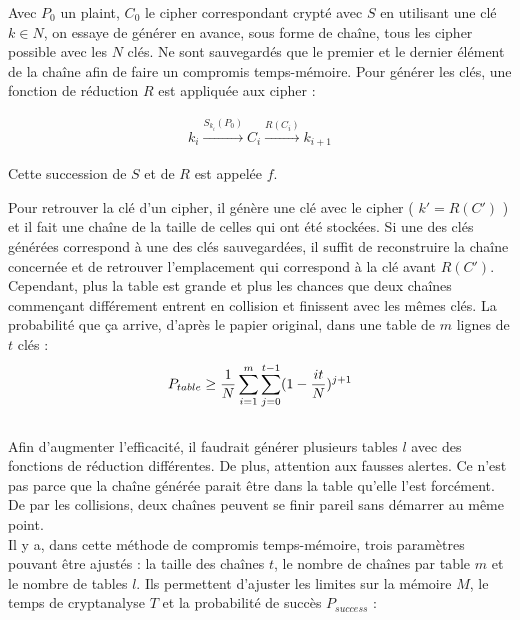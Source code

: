
	Avec $P_0$ un \gls{plaint}, $C_0$ le \gls{cipher} correspondant crypté avec $S$ en utilisant une clé $k \in N$, on essaye de générer en avance, sous forme de chaîne, tous les \gls{cipher} possible avec les $N$ clés. Ne sont sauvegardés que le premier et le dernier élément de la chaîne afin de faire un compromis temps-mémoire. Pour générer les clés, une fonction de réduction $R$ est appliquée aux \gls{cipher} :

	\begin{align*}
		k_i \overset{S_{k_i}(P_0)}{\longrightarrow} C_i \overset{R(C_i)}{\longrightarrow} k_{i+1}
	\end{align*}

	Cette succession de $S$ et de $R$ est appelée $f$.

	Pour retrouver la clé d'un \gls{cipher}, il génère une clé avec le \gls{cipher} ( $k' = R(C')$ ) et il fait une chaîne de la taille de celles qui ont été stockées. Si une des clés générées correspond à une des clés sauvegardées, il suffit de reconstruire la chaîne concernée et de retrouver l'emplacement qui correspond à la clé avant $R(C')$.\\

	Cependant, plus la table est grande et plus les chances que deux chaînes commençant différement entrent en collision et finissent avec les mêmes clés. La probabilité que ça arrive, d'après le papier original\cite{ehellman}, dans une table de $m$ lignes de $t$ clés :\\

	\begin{align*}
		P_{table} \ge{} \frac{1}{N} \sum\limits_{i=1}^{m}\sum\limits_{j=0}^{t-1} (1 - \frac{it}{N})^{j+1}
	\end{align*}\\

	Afin d'augmenter l'efficacité, il faudrait générer plusieurs tables $l$ avec des fonctions de réduction différentes. De plus, attention aux fausses alertes. Ce n'est pas parce que la chaîne générée parait être dans la table qu'elle l'est forcément. De par les collisions, deux chaînes peuvent se finir pareil sans démarrer au même point.\\

	Il y a, dans cette méthode de compromis temps-mémoire, trois paramètres pouvant être ajustés : la taille des chaînes $t$, le nombre de chaînes par table $m$ et le nombre de tables $l$. Ils permettent d'ajuster les limites sur la mémoire $M$, le temps de cryptanalyse $T$ et la probabilité de succès $P_{success}$\cite{Oech03} :\\

